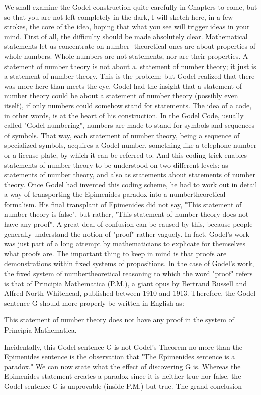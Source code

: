 We shall examine the Godel construction quite carefully in Chapters to come, but so that you are not left completely in the dark, I will sketch here, in a few strokes, the core of the idea, hoping that what you see will trigger ideas in your mind. First of all, the difficulty should be made absolutely clear. Mathematical statements-let us concentrate on number- theoretical ones-are about properties of whole numbers. Whole numbers are not statements, nor are their properties. A statement of number theory is not about a. statement of number theory; it just is a statement of number theory. This is the problem; but Godel realized that there was more here than meets the eye. Godel had the insight that a statement of number theory could be about a statement of number theory (possibly even itself), if only numbers could somehow stand for statements. The idea of a code, in other words, is at the heart of his construction. In the Godel Code, usually called "Godel-numbering", numbers are made to stand for symbols and sequences of symbols. That way, each statement of number theory, being a sequence of specialized symbols, acquires a Godel number, something like a telephone number or a license plate, by which it can be referred to. And this coding trick enables statements of number theory to be understood on two different levels: as statements of number theory, and also as statements about statements of number theory. Once Godel had invented this coding scheme, he had to work out in detail a way of transporting the Epimenides paradox into a numbertheoretical formalism. His final transplant of Epimenides did not say, "This statement of number theory is false", but rather, "This statement of number theory does not have any proof". A great deal of confusion can be caused by this, because people generally understand the notion of "proof" rather vaguely. In fact, Godel's work was just part of a long attempt by mathematicians to explicate for themselves what proofs are. The important thing to keep in mind is that proofs are demonstrations within fixed systems of propositions. In the case of Godel's work, the fixed system of numbertheoretical reasoning to which the word "proof" refers is that of Principia Mathematica (P.M.), a giant opus by Bertrand Russell and Alfred North Whitehead, published between 1910 and 1913. Therefore, the Godel sentence G should more properly be written in English as: 

This statement of number theory does not have any proof in the system of Principia Mathematica. 

Incidentally, this Godel sentence G is not Godel's Theorem-no more than the Epimenides sentence is the observation that "The Epimenides sentence is a paradox." We can now state what the effect of discovering G is. Whereas the Epimenides statement creates a paradox since it is neither true nor false, the Godel sentence G is unprovable (inside P.M.) but true. The grand conclusion%








